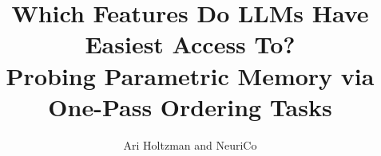 \documentclass{article}
\title{Which Features Do LLMs Have Easiest Access To?\\Probing Parametric Memory via One-Pass Ordering Tasks}
\author{Ari Holtzman and NeuriCo}
\begin{document}
\maketitle

\begin{abstract}

\end{abstract}










\end{document}

